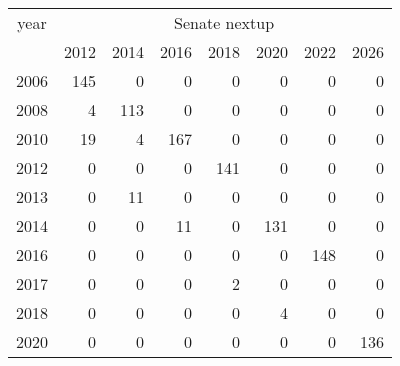 \footnotesize\begin{tabular}[t]{lrrrrrrr}
\toprule
\multicolumn{1}{c}{year} & \multicolumn{7}{c}{Senate nextup} \\
\cmidrule(l{3pt}r{3pt}){1-1} \cmidrule(l{3pt}r{3pt}){2-8}
  & 2012 & 2014 & 2016 & 2018 & 2020 & 2022 & 2026\\
\midrule
2006 & 145 & 0 & 0 & 0 & 0 & 0 & 0\\
2008 & 4 & 113 & 0 & 0 & 0 & 0 & 0\\
2010 & 19 & 4 & 167 & 0 & 0 & 0 & 0\\
2012 & 0 & 0 & 0 & 141 & 0 & 0 & 0\\
2013 & 0 & 11 & 0 & 0 & 0 & 0 & 0\\
2014 & 0 & 0 & 11 & 0 & 131 & 0 & 0\\
2016 & 0 & 0 & 0 & 0 & 0 & 148 & 0\\
2017 & 0 & 0 & 0 & 2 & 0 & 0 & 0\\
2018 & 0 & 0 & 0 & 0 & 4 & 0 & 0\\
2020 & 0 & 0 & 0 & 0 & 0 & 0 & 136\\
\bottomrule
\end{tabular}
